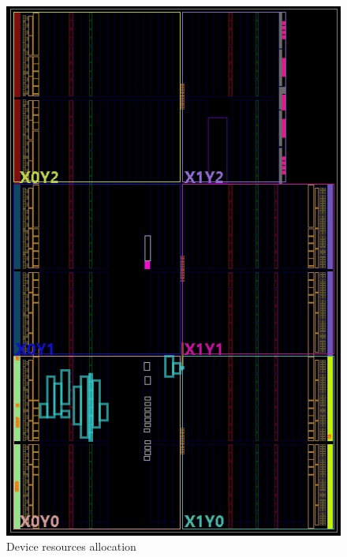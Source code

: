 \documentclass[11pt,a4paper]{article}
\begin{document}
    \begin{figure}[!ht]
        \centering
        \includegraphics[width=.6\textwidth]{src/device.png}
        \caption{\label{fig:device}Device resources allocation}
    \end{figure}
\end{document}

